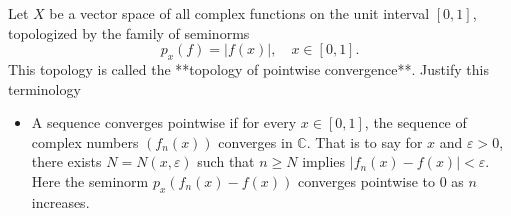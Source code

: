 Let $X$ be a vector space of all complex functions on the unit interval $[0,1]$, topologized by the family of seminorms
$$
p_x(f)=|f(x)|, \quad x\in [0,1].
$$
This topology is called the **topology of pointwise convergence**. Justify this terminology
\begin{itemize}
    \item A sequence converges pointwise if for every $x \in [0,1]$, the sequence of complex numbers $(f_n(x))$ converges in $\mathbb{C}$. That is to say for $x$ and $\varepsilon>0$, there exists $N=N(x,\varepsilon)$ such that $n\geq N$ implies $|f_n(x)-f(x)|<\varepsilon$. Here the seminorm $p_x(f_n(x)-f(x))$ converges pointwise to $0$ as $n$ increases.
\end{itemize}